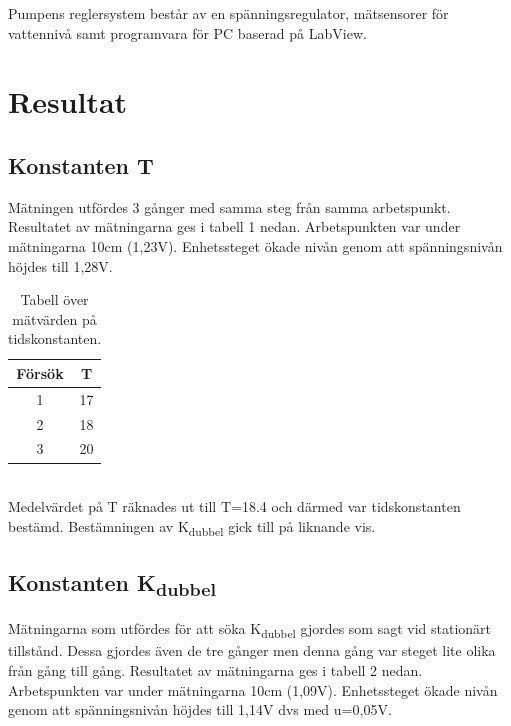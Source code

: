 \documentclass{article}
\begin{document}
Pumpens reglersystem består av en spänningsregulator, mätsensorer för vattennivå samt programvara för PC baserad på LabView.
\newpage


\section{Resultat}


\subsection{Konstanten T}
Mätningen utfördes 3 gånger med samma steg från samma arbetspunkt. Resultatet av mätningarna ges i tabell 1 nedan. Arbetspunkten var under mätningarna 10cm (1,23V). Enhetssteget ökade nivån genom att spänningsnivån höjdes till 1,28V. 

\begin{table}[ht] 
\centering 
\begin{tabular}{c c} 
Försök & T \\ [0.5ex] %
\hline
1 & 17 \\
2 & 18 \\
3 & 20 \\

\end{tabular} 
\caption{Tabell över mätvärden på tidskonstanten.}

\end{table}
~\\ %
Medelvärdet på T räknades ut till T=18.4 och därmed var tidskonstanten bestämd. 
Bestämningen av K\textsubscript{dubbel} gick till på liknande vis. 


\subsection{Konstanten K\textsubscript{dubbel}}

Mätningarna som utfördes för att söka K\textsubscript{dubbel} gjordes som sagt vid stationärt tillstånd. Dessa gjordes även de tre gånger men denna gång var steget lite olika från gång till gång. Resultatet av mätningarna ges i tabell 2 nedan. Arbetspunkten var under mätningarna 10cm (1,09V). Enhetssteget ökade nivån genom att spänningsnivån höjdes till 1,14V dvs med u=0,05V. 
\end{document}
